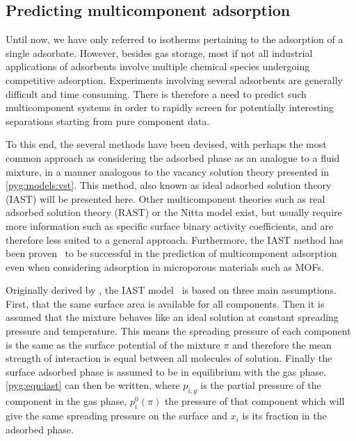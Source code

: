 
\subsection{Predicting multicomponent adsorption}\label{pyg:iast}

Until now, we have only referred to isotherms pertaining to the adsorption
of a single adsorbate. However, besides gas storage, most if not all
industrial applications of adsorbents involve multiple chemical 
species undergoing competitive adsorption. Experiments involving
several adsorbents are generally difficult and time consuming.
There is therefore a need to predict such multicomponent systems
in order to rapidly screen for potentially interesting separations
starting from pure component data.

To this end, the several methods have been devised, with perhaps
the most common approach as considering the adsorbed phase as 
an analogue to a fluid mixture, in a manner analogous to the 
vacancy solution theory presented in \autoref{pyg:models:vst}. 
This method, also known as ideal adsorbed solution theory (IAST) 
will be presented here. Other multicomponent theories
such as real adsorbed solution theory (RAST) or the Nitta model
exist, but usually require more information such as specific
surface binary activity coefficients, and are therefore less suited to
a general approach. Furthermore, the IAST method has been 
proven~\cite{cessfordEvaluationIdealAdsorbed2012,%
vanheestIdentificationMetalOrganic2012} to be successful in the 
prediction of multicomponent adsorption even when considering
adsorption in microporous materials such as MOFs.

Originally derived by \citeauthor{myersThermodynamicsMixedgasAdsorption1965},
the IAST model~\cite{myersThermodynamicsMixedgasAdsorption1965} is based
on three main assumptions. First, that the 
same surface area is available for all components. Then it is 
assumed that the mixture behaves like an ideal solution at constant 
spreading pressure and temperature. This means the spreading pressure of
each component is the same as the surface potential of the mixture \(\pi\)
and therefore the mean strength of interaction is equal between all
molecules of solution. Finally the surface adsorbed phase is assumed 
to be in equilibrium with the gas phase. \autoref{pyg:eqn:iast}
can then be written, where \(p_{i,g}\) is the partial pressure of
the component in the gas phase, \( p_i^0(\pi)\) the pressure of
that component which will give the same spreading pressure on the
surface and \(x_i\) is its fraction in the adsorbed phase.

